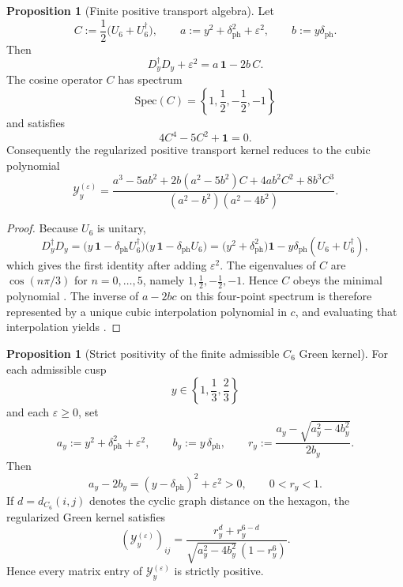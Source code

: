 \documentclass[11pt,a4paper]{article}
\theoremstyle{definition}
\newtheorem{proposition}[theorem]{Proposition}
\theoremstyle{remark}
\begin{document}
\begin{proposition}[Finite positive transport algebra]
\label{prop:finite-positive-transport-algebra}
Let
\[
C:=\frac12\bigl(U_6+U_6^\dagger\bigr),
\qquad
a:=y^2+\delta_{\mathrm{ph}}^2+\varepsilon^2,
\qquad
b:=y\delta_{\mathrm{ph}}.
\]
Then
\[
D_y^\dagger D_y+\varepsilon^2=a\,\mathbf 1-2b\,C.
\]
The cosine operator $C$ has spectrum
\[
\mathrm{Spec}(C)=\left\{1,\frac12,-\frac12,-1\right\}
\]
and satisfies
\begin{equation}
\label{eq:c6-cosine-polynomial}
4C^4-5C^2+\mathbf 1=0.
\end{equation}
Consequently the regularized positive transport kernel reduces to the cubic polynomial
\begin{equation}
\label{eq:finite-positive-transport-kernel}
\mathcal Y_y^{(\varepsilon)}
=
\frac{
a^3-5ab^2
+2b(a^2-5b^2)C
+4ab^2C^2
+8b^3C^3
}{
(a^2-b^2)(a^2-4b^2)
}.
\end{equation}
\end{proposition}

\begin{proof}
Because $U_6$ is unitary,
\[
D_y^\dagger D_y
=
\bigl(y\,\mathbf 1-\delta_{\mathrm{ph}}U_6^\dagger\bigr)
\bigl(y\,\mathbf 1-\delta_{\mathrm{ph}}U_6\bigr)
=
\bigl(y^2+\delta_{\mathrm{ph}}^2\bigr)\mathbf 1
-y\delta_{\mathrm{ph}}(U_6+U_6^\dagger),
\]
which gives the first identity after adding $\varepsilon^2$. The eigenvalues of $C$ are $\cos(n\pi/3)$ for $n=0,\dots,5$, namely $1,\frac12,-\frac12,-1$. Hence $C$ obeys the minimal polynomial . The inverse of $a-2bc$ on this four-point spectrum is therefore represented by a unique cubic interpolation polynomial in $c$, and evaluating that interpolation yields .
\end{proof}

\begin{proposition}[Strict positivity of the finite admissible $C_6$ Green kernel]
\label{prop:strict-positive-c6-green}
For each admissible cusp
\[
y\in\left\{1,\frac13,\frac23\right\}
\]
and each $\varepsilon\ge 0$, set
\[
a_y:=y^2+\delta_{\mathrm{ph}}^2+\varepsilon^2,
\qquad
b_y:=y\,\delta_{\mathrm{ph}},
\qquad
r_y:=\frac{a_y-\sqrt{a_y^2-4b_y^2}}{2b_y}.
\]
Then
\[
a_y-2b_y=(y-\delta_{\mathrm{ph}})^2+\varepsilon^2>0,
\qquad
0<r_y<1.
\]
If $d=d_{C_6}(i,j)$ denotes the cyclic graph distance on the hexagon, the regularized Green
kernel satisfies
\[
(\mathcal Y_y^{(\varepsilon)})_{ij}
=
\frac{r_y^{d}+r_y^{6-d}}
{\sqrt{a_y^2-4b_y^2}\,(1-r_y^6)}.
\]
Hence every matrix entry of $\mathcal Y_y^{(\varepsilon)}$ is strictly positive.
\end{proposition}
\end{document}
